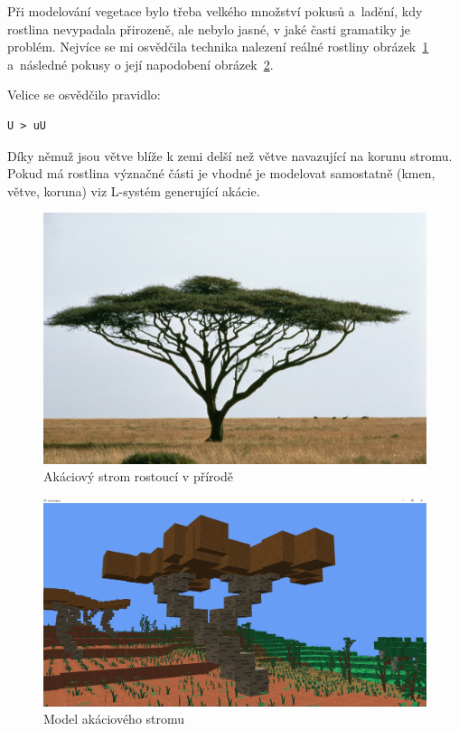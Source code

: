 \documentclass[thesis=M,czech]{FITthesis}[2019/12/23]
\begin{document}
Při modelování vegetace bylo třeba velkého množství pokusů a~ladění, kdy rostlina nevypadala přirozeně, ale nebylo jasné, v jaké časti gramatiky je problém. Nejvíce se mi osvědčila technika nalezení reálné rostliny obrázek~\ref{fig:acacia_nature} a~následné pokusy o její napodobení obrázek~\ref{fig:acacia_engine}.

Velice se osvědčilo pravidlo:

\begin{verbatim}
U > uU
\end{verbatim}

Díky němuž jsou větve blíže k zemi delší než větve navazující na korunu stromu. Pokud má rostlina význačné části je vhodné je modelovat samostatně (kmen, větve, koruna) viz L-systém generující akácie.

\begin{figure}\centering
	\includegraphics[width=\textwidth]{images/acacia_nature}
	\caption[Akáciový strom rostoucí v přírodě]{Akáciový strom rostoucí v přírodě~\cite{acacia}}\label{fig:acacia_nature}
\end{figure}

\begin{figure}\centering
	\includegraphics[width=\textwidth]{images/acacia_engine}
	\caption[Model akáciového stromu]{Model akáciového stromu}\label{fig:acacia_engine}
\end{figure}
\end{document}
